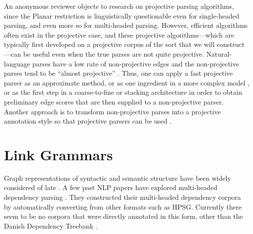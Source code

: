 \documentclass[a4paper,11pt]{article}
\newcommand{\Note}[4][]{\todo[author=#2,color=#3,fancyline,#1]{#4}}
\newcommand{\noteJE}[2][]{\Note[size=\small,#1]{JE}{green!40}{#2}}
\newcommand{\NoteJE}[2][]{\noteJE[inline,#1]{#2}}
\begin{document}
An anonymous reviewer objects to research on projective parsing algorithms, since the {\sc Planar} restriction is linguistically questionable even for single-headed parsing, and even more so for multi-headed parsing.  However, efficient algorithms often exist in the projective case, and these projective algorithms---which are typically first developed on a projective corpus of the sort that we will construct---can be useful even when the true parses are not quite projective.
Natural-language parses have a low rate of non-projective edges \cite{nivre-slides} and the non-projective parses tend to be ``almost projective'' \cite{pitler-et-al-2013}.  Thus, one can apply a fast projective parser as an approximate method, or as one ingredient in a more complex model \cite{martins-et-al-2013}, or as the first step in a coarse-to-fine or stacking architecture \cite{rush-petrov-2012,martins-et-al-2008} in order to obtain preliminary edge scores that are then supplied to a non-projective parser.  Another approach is to transform non-projective parses into a projective annotation style so that projective parsers can be used \cite{nivre-nilsson-2005,nivre-2009}.  

\section{Link Grammars}

Graph representations of syntactic and semantic structure have been widely considered of late \cite{demarneffe-manning-2008,demarneffe-et-al-2013,ivanova-et-al-2012,AMR-2013,oepen-et-al-2014}.  A few past NLP papers have explored multi-headed dependency parsing \cite{buchkromann-2006,mcdonald-pereira-2006,sagae-tsujii-2008,gomezrodriguez-nivre-2013}.  They constructed their multi-headed dependency corpora by automatically converting from other formats such as HPSG.  Currently there seem to be no corpora that were directly annotated in this form, other than the Danish Dependency Treebank \cite{kromann-2003}.

\end{document}
